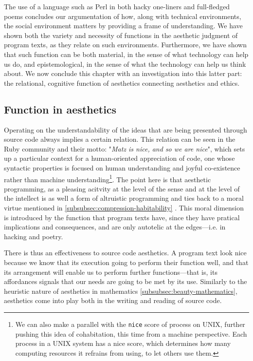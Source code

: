 The use of a language such as Perl in both hacky one-liners and full-fledged poems concludes our argumentation of how, along with technical environments, the social environment matters by providing a frame of understanding. We have shown both the variety and necessity of functions in the aesthetic judgment of program texts, as they relate on such environments. Furthermore, we have shown that such function can be both material, in the sense of what technology can help us do, and epistemological, in the sense of what the technology can help us think about. We now conclude this chapter with an investigation into this latter part: the relational, cognitive function of aesthetics connecting aesthetics and ethics.

\subsection{Function in aesthetics}
\label{subsec:function-aesthetics}

Operating on the understandability of the ideas that are being presented through source code always implies a certain relation. This relation can be seen in the Ruby community and their motto: "\emph{Matz is nice, and so we are nice}", which sets up a particular context for a human-oriented appreciation of code, one whose syntactic properties is focused on human understanding and joyful co-existence rather than machine understanding\footnote{We can also make a parallel with the \lstinline{nice} score of process on UNIX, further pushing this idea of cohabitation, this time from a machine perspective. Each process in a UNIX system has a nice score, which determines how many computing resources it refrains from using, to let others use them.}. The point here is that aesthetic programming, as a pleasing acitvity at the level of the sense and at the level of the intellect is as well a form of altruistic programming and ties back to a moral virtue mentioned in \ref{subsubsec:compression-habitability} \citep{fleetwood-boldt_matz_2020}. This moral dimension is introduced by the function that program texts have, since they have pratical implications and consequences, and are only autotelic at the edges—i.e. in hacking and poetry.

There is thus an effectiveness to source code aesthetics. A program text look nice because we know that its execution going to perform their function well, and that its arrangement will enable us to perform further functions—that is, its affordances signals that our needs are going to be met by its use. Similarly to the heuristic nature of aesthetics in mathematics \ref{subsubsec:beauty-mathematics}, aesthetics come into play both in the writing and reading of source code.

